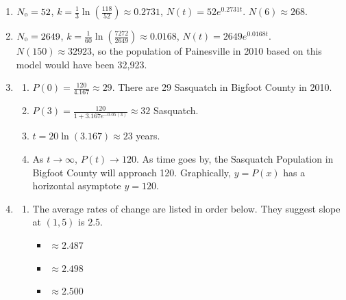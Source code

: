 \begin{enumerate}
\setcounter{enumi}{\value{HW}}


\item  $N_{\text{\tiny $0$}} = 52$,  $k = \frac{1}{3} \ln\left( \frac{118}{52}\right) \approx 0.2731$, $N(t) = 52e^{0.2731t}$.  $N(6) \approx 268$. 

\item  $N_{\text{\tiny $0$}} = 2649$,  $k = \frac{1}{60} \ln\left( \frac{7272}{2649}\right) \approx 0.0168$, $N(t) = 2649e^{0.0168t}$.  $N(150) \approx 32923$, so the population of Painesville in 2010 based on this model would have been 32,923.



\item  \begin{enumerate}  \item  $P(0) = \frac{120}{4.167} \approx 29$.  There are 29 Sasquatch in Bigfoot County in 2010.

\item  $P(3) = \frac{120}{1+3.167e^{-0.05(3)}} \approx 32$ Sasquatch.

\item  $t = 20 \ln(3.167) \approx 23$ years.

\item  As $t \rightarrow \infty$, $P(t) \rightarrow 120$.  As time goes by, the Sasquatch Population in Bigfoot County will approach 120.  Graphically,  $y = P(x)$ has a horizontal asymptote $y=120$.

\end{enumerate}

\item 

\begin{enumerate}

\addtocounter{enumii}{1}

\item The average rates of change are listed in order below. They suggest  slope at $(1,5)$ is $2.5$.  

\begin{multicols}{6}

\begin{itemize}

\item $\approx 2.487$

\item $\approx 2.498$

\item $\approx 2.500$


\end{itemize}
\end{multicols}
\end{enumerate}
\end{enumerate}
